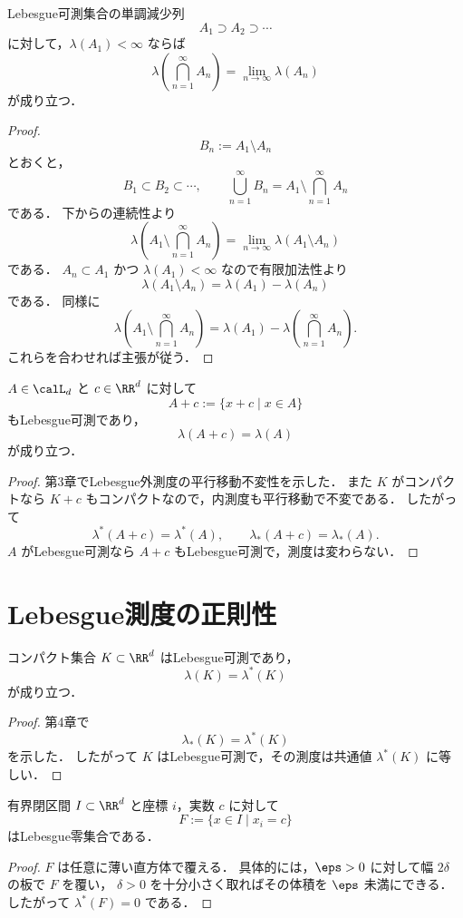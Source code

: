 \begin{theorem}[上からの連続性]
Lebesgue可測集合の単調減少列
\[
A_1\supset A_2\supset \cdots
\]
に対して，$\lambda(A_1)<\infty$ ならば
\[
\lambda\left(\bigcap_{n=1}^{\infty}A_n\right)
=
\lim_{n\to\infty}\lambda(A_n)
\]
が成り立つ．
\end{theorem}
\begin{proof}
\[
B_n:=A_1\setminus A_n
\]
とおくと，
\[
B_1\subset B_2\subset \cdots,
\qquad
\bigcup_{n=1}^{\infty}B_n
=
A_1\setminus\bigcap_{n=1}^{\infty}A_n
\]
である．
下からの連続性より
\[
\lambda\left(A_1\setminus\bigcap_{n=1}^{\infty}A_n\right)
=
\lim_{n\to\infty}\lambda(A_1\setminus A_n)
\]
である．
$A_n\subset A_1$ かつ $\lambda(A_1)<\infty$ なので有限加法性より
\[
\lambda(A_1\setminus A_n)=\lambda(A_1)-\lambda(A_n)
\]
である．
同様に
\[
\lambda\left(A_1\setminus\bigcap_{n=1}^{\infty}A_n\right)
=
\lambda(A_1)-\lambda\left(\bigcap_{n=1}^{\infty}A_n\right).
\]
これらを合わせれば主張が従う．
\end{proof}

\begin{proposition}[平行移動不変性]
$A\in\calL_d$ と $c\in\RR^d$ に対して
\[
A+c:=\{x+c\mid x\in A\}
\]
もLebesgue可測であり，
\[
\lambda(A+c)=\lambda(A)
\]
が成り立つ．
\end{proposition}
\begin{proof}
第3章でLebesgue外測度の平行移動不変性を示した．
また $K$ がコンパクトなら $K+c$ もコンパクトなので，内測度も平行移動で不変である．
したがって
\[
\lambda^*(A+c)=\lambda^*(A),
\qquad
\lambda_*(A+c)=\lambda_*(A).
\]
$A$ がLebesgue可測なら $A+c$ もLebesgue可測で，測度は変わらない．
\end{proof}

\section{Lebesgue測度の正則性}

\begin{theorem}[コンパクト集合]
コンパクト集合 $K\subset\RR^d$ はLebesgue可測であり，
\[
\lambda(K)=\lambda^*(K)
\]
が成り立つ．
\end{theorem}
\begin{proof}
第4章で
\[
\lambda_*(K)=\lambda^*(K)
\]
を示した．
したがって $K$ はLebesgue可測で，その測度は共通値 $\lambda^*(K)$ に等しい．
\end{proof}

\begin{lemma}[座標超平面片]
有界閉区間 $I\subset\RR^d$ と座標 $i$，実数 $c$ に対して
\[
F:=\{x\in I\mid x_i=c\}
\]
はLebesgue零集合である．
\end{lemma}
\begin{proof}
$F$ は任意に薄い直方体で覆える．
具体的には，$\eps>0$ に対して幅 $2\delta$ の板で $F$ を覆い，
$\delta>0$ を十分小さく取ればその体積を $\eps$ 未満にできる．
したがって $\lambda^*(F)=0$ である．
\end{proof}

